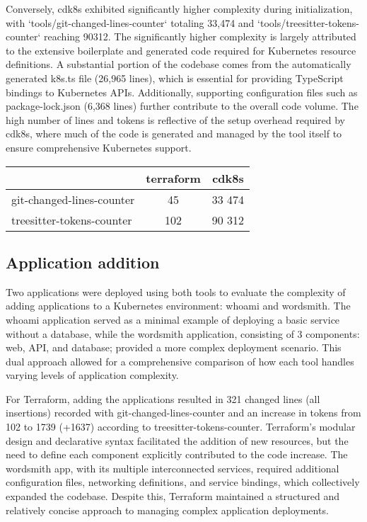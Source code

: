 \documentclass{article}
\begin{document}
Conversely, cdk8s exhibited significantly higher complexity during initialization, with `tools/git-changed-lines-counter` totaling 33,474 and `tools/treesitter-tokens-counter` reaching 90312. The significantly higher complexity is largely attributed to the extensive boilerplate and generated code required for Kubernetes resource definitions. A substantial portion of the codebase comes from the automatically generated k8s.ts file (26,965 lines), which is essential for providing TypeScript bindings to Kubernetes APIs. Additionally, supporting configuration files such as package-lock.json (6,368 lines) further contribute to the overall code volume. The high number of lines and tokens is reflective of the setup overhead required by cdk8s, where much of the code is generated and managed by the tool itself to ensure comprehensive Kubernetes support.

\begin{center}
    \begin{tabular}{l | cc} 
        & terraform & cdk8s \\
        \hline
        git-changed-lines-counter & 45 & 33 474 \\
        treesitter-tokens-counter & 102 & 90 312 \\
    \end{tabular} 
\end{center}


\subsection{Application addition}
Two applications were deployed using both tools to evaluate the complexity of adding applications to a Kubernetes environment: whoami and wordsmith. The whoami application served as a minimal example of deploying a basic service without a database, while the wordsmith application, consisting of 3 components: web, API, and database; provided a more complex deployment scenario. This dual approach allowed for a comprehensive comparison of how each tool handles varying levels of application complexity.

For Terraform, adding the applications resulted in 321 changed lines (all insertions) recorded with git-changed-lines-counter and an increase in tokens from 102 to 1739 (+1637) according to treesitter-tokens-counter. Terraform’s modular design and declarative syntax facilitated the addition of new resources, but the need to define each component explicitly contributed to the code increase. The wordsmith app, with its multiple interconnected services, required additional configuration files, networking definitions, and service bindings, which collectively expanded the codebase. Despite this, Terraform maintained a structured and relatively concise approach to managing complex application deployments.
\end{document}
